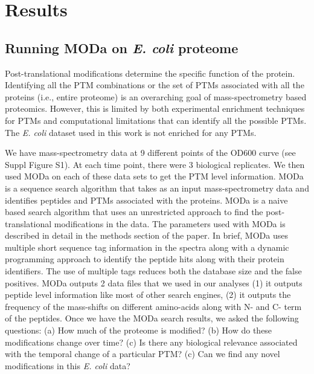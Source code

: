 \documentclass[12pt]{article}
\begin{document}
\section{Results}

\subsection{Running MODa on \emph{E. coli} proteome}
Post-translational modifications determine the specific function of the protein. Identifying all the PTM combinations or the set of PTMs associated with all the proteins (i.e., entire proteome) is an overarching goal of mass-spectrometry based proteomics. However, this is limited by both experimental enrichment techniques for PTMs and computational limitations that can identify all the possible PTMs. The \emph{E. coli} dataset used in this work is not enriched for any PTMs.

We have mass-spectrometry data at 9 different points of the OD600 curve (see Suppl Figure S1). At each time point, there were 3 biological replicates. We then used MODa on each of these data sets to get the PTM level information. MODa is a sequence search algorithm that takes as an input mass-spectrometry data and identifies peptides and PTMs associated with the proteins. MODa is a naive based search algorithm that uses an unrestricted approach to find the post-translational modifications in the data. The parameters used with MODa is described in detail in the methods section of the paper. In brief, MODa uses multiple short sequence tag information in the spectra along with a dynamic programming approach to identify the peptide hits along with their protein identifiers. The use of multiple tags reduces both the database size and the false positives. MODa outputs 2 data files that we used in our analyses (1) it outputs peptide level information like most of other search engines, (2) it outputs the frequency of the mass-shifts on different amino-acids along with N- and C- term of the peptides. Once we have the MODa search results, we asked the following questions: (a) How much of the proteome is modified? (b) How do these modifications change over time? (c) Is there any biological relevance associated with the temporal change of a particular PTM? (c) Can we find any novel modifications in this \emph{E. coli} data? 

\end{document}
